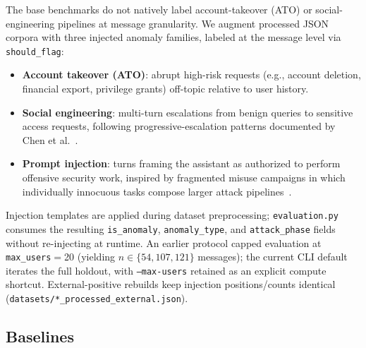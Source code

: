 \documentclass[conference]{IEEEtran}
\begin{document}
The base benchmarks do not natively label account-takeover (ATO) or social-engineering
pipelines at message granularity.
We augment processed JSON corpora with three injected anomaly families, labeled at the
message level via \texttt{should\_flag}:
\begin{itemize}[noitemsep]
  \item \textbf{Account takeover (ATO)}: abrupt high-risk requests (e.g., account
        deletion, financial export, privilege grants) off-topic relative to user history.
  \item \textbf{Social engineering}: multi-turn escalations from benign queries to
        sensitive access requests, following progressive-escalation patterns
        documented by Chen et al.~\cite{chen2025personalized}.
  \item \textbf{Prompt injection}: turns framing the assistant as authorized to perform
        offensive security work, inspired by fragmented misuse campaigns in which
        individually innocuous tasks compose larger attack pipelines~\cite{anthropic2025espionage}.
\end{itemize}
Injection templates are applied during dataset preprocessing; \texttt{evaluation.py}
consumes the resulting \texttt{is\_anomaly}, \texttt{anomaly\_type}, and
\texttt{attack\_phase} fields without re-injecting at runtime.
An earlier protocol capped evaluation at \texttt{max\_users}${}={}$20 (yielding
$n \in \{54, 107, 121\}$ messages); the current CLI default iterates the full
holdout, with \texttt{--max-users} retained as an explicit compute shortcut.
External-positive rebuilds keep injection positions/counts identical
(\texttt{datasets/*\_processed\_external.json}).

\subsection{Baselines}
\end{document}
